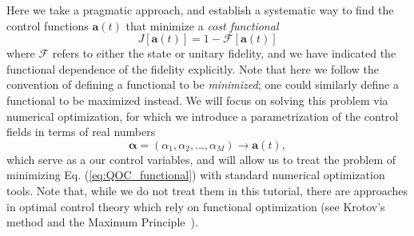 Here we take a pragmatic approach, and establish a systematic way to find the control functions $\bm{a}(t)$ that minimize a \textit{cost functional}
\begin{equation}
    J[\bm{a}(t)] = 1-\mathcal{F}[\bm{a}(t)]
    \label{eq:QOC_functional}
\end{equation}
where $\mathcal{F}$ refers to either the state or unitary fidelity, and we have indicated the functional dependence of the fidelity explicitly. Note that here we follow the convention of defining a functional to be \textit{minimized}; one could similarly define a functional to be maximized instead. We will focus on solving this problem via numerical optimization, for which we introduce a parametrization of the control fields in terms of real numbers
\begin{equation}
    \bm{\alpha}=(\alpha_1,\alpha_2,\ldots,\alpha_M) \rightarrow \bm{a}(t),
    \label{eq:QOC_parametrization}
\end{equation}
which serve as a our control variables, and will allow us to treat the problem of minimizing Eq. (\ref{eq:QOC_functional}) with standard numerical optimization tools. Note that, while we do not treat them in this tutorial, there are approaches in optimal control theory which rely on functional optimization (see Krotov's method \cite{krotov1999,reich2012} and the  Maximum Principle~\cite{PRXQtutorial}). 

